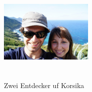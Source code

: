 \begin{figure} 
  \begin{centering}
    \includegraphics[width=0.4\textwidth, height=5cm, keepaspectratio]{../Bilder/Korsika/6.jpg}
    \caption{Zwei Entdecker uf Korsika}
  \end{centering}
\end{figure} 


